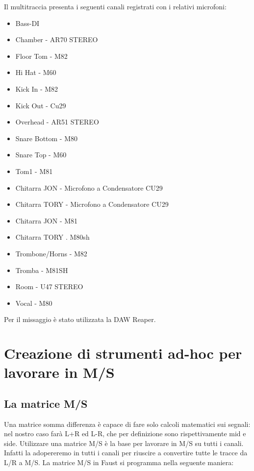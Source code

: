 \documentclass{article}
\begin{document}
    Il multitraccia presenta i seguenti canali registrati con i relativi microfoni:
    \begin{itemize}
        \item Bass-DI
        \item Chamber - AR70 STEREO
        \item Floor Tom - M82
        \item Hi Hat - M60
        \item Kick In - M82
        \item Kick Out - Cu29
        \item Overhead - AR51 STEREO
        \item Snare Bottom - M80
        \item Snare Top - M60
        \item Tom1 - M81
        \item Chitarra JON - Microfono a Condensatore CU29
        \item Chitarra TORY - Microfono a Condensatore CU29
        \item Chitarra JON - M81
        \item Chitarra TORY . M80sh
        \item Trombone/Horns - M82
        \item Tromba - M81SH
        \item Room - U47 STEREO
        \item Vocal - M80
    \end{itemize}
    Per il missaggio è stato utilizzata la DAW Reaper.
    
\section{Creazione di strumenti ad-hoc per lavorare in M/S}

    \subsection{La matrice M/S}
    Una matrice somma differenza è capace di fare solo calcoli matematici sui segnali: nel nostro caso farà L+R ed L-R, che per definizione sono rispettivamente mid e side. Utilizzare una matrice M/S è la base per lavorare in M/S su tutti i canali. Infatti la adopereremo in tutti i canali per riuscire a convertire tutte le tracce da L/R a M/S. La matrice M/S in Faust si programma nella seguente maniera:
    
          
\end{document}
